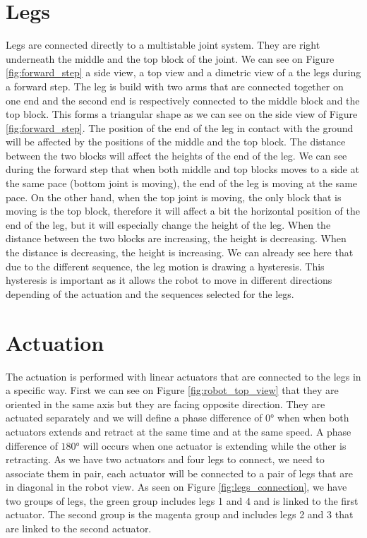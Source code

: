     \section{Legs}\label{sec:legs}
        Legs are connected directly to a multistable joint system. They are right underneath the middle and the top block of the joint. We can see on Figure \ref{fig:forward_step} a side view, a top view and a dimetric view of a the legs during a forward step. 
        The leg is build with two arms that are connected together on one end and the second end is respectively connected to the middle block and the top block. This forms a triangular shape as we can see on the side view of Figure \ref{fig:forward_step}. The position of the end of the leg in contact with the ground will be affected by the positions of the middle and the top block. The distance between the two blocks will affect the heights of the end of the leg. We can see during the forward step that when both middle and top blocks moves to a side at the same pace (bottom joint is moving), the end of the leg is moving at the same pace. On the other hand, when the top joint is moving, the only block that is moving is the top block, therefore it will affect a bit the horizontal position of the end of the leg, but it will especially change the height of the leg. When the distance between the two blocks are increasing, the height is decreasing. When the distance is decreasing, the height is increasing. We can already see here that due to the different sequence, the leg motion is drawing a hysteresis. This hysteresis is important as it allows the robot to move in different directions depending of the actuation and the sequences selected for the legs. 
        
    \section{Actuation}\label{sec:actuation}
        The actuation is performed with linear actuators that are connected to the legs in a specific way. First we can see on Figure \ref{fig:robot_top_view} that they are oriented in the same axis but they are facing opposite direction. They are actuated separately and we will define a phase difference of $0°$ when when both actuators extends and retract at the same time and at the same speed. A phase difference of $180°$ will occurs when one actuator is extending while the other is retracting. As we have two actuators and four legs to connect, we need to associate them in pair, each actuator will be connected to a pair of legs that are in diagonal in the robot view. As seen on Figure \ref{fig:legs_connection}, we have two groups of legs, the green group includes legs 1 and 4 and is linked to the first actuator. The second group is the magenta group and includes legs 2 and 3 that are linked to the second actuator. 
        
